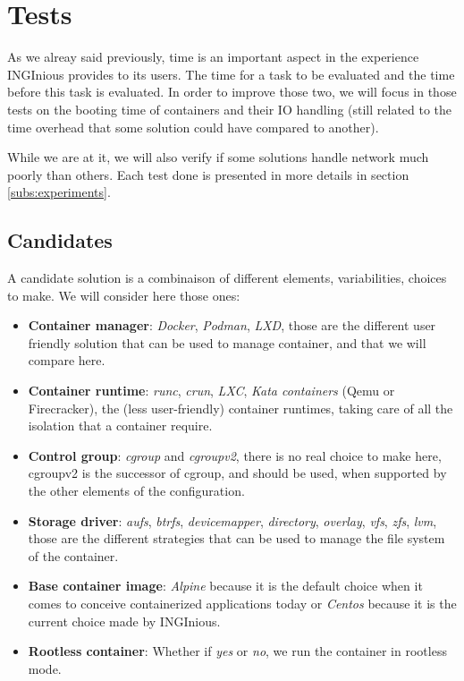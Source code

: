 \section{Tests}
As we alreay said previously, time is an important aspect in the experience INGInious provides to its users.  The time for a task to be evaluated and the time before this task is evaluated.  In order to improve those two, we will focus in those tests on the booting time of containers and their IO handling (still related to the time overhead that some solution could have compared to another).  %

While we are at it, we will also verify if some solutions handle network much poorly than others.  Each test done is presented in more details in section \ref{subs:experiments}.


\subsection{Candidates}\label{subs:candidates}
A candidate solution is a combinaison of different elements, variabilities, choices to make.  We will consider here those ones:
\begin{itemize}
  \renewcommand\labelitemi{--}
  \item \textbf{Container manager}: \textit{Docker}, \textit{Podman}, \textit{LXD}, those are the different user friendly solution that can be used to manage container, and that we will compare here.
  \item \textbf{Container runtime}: \textit{runc}, \textit{crun}, \textit{LXC}, \textit{Kata containers} (Qemu or Firecracker), the (less user-friendly) container runtimes, taking care of all the isolation that a container require.
  \item \textbf{Control group}: \textit{cgroup} and \textit{cgroupv2}, there is no real choice to make here, cgroupv2 is the successor of cgroup, and should be used, when supported by the other elements of the configuration.
  \item \textbf{Storage driver}: \textit{aufs}, \textit{btrfs}, \textit{devicemapper}, \textit{directory}, \textit{overlay}, \textit{vfs}, \textit{zfs}, \textit{lvm}, those are the different strategies that can be used to manage the file system of the container.
  \item \textbf{Base container image}: \textit{Alpine} because it is the default choice when it comes to conceive containerized applications today or \textit{Centos} because it is the current choice made by INGInious.
  \item \textbf{Rootless container}: Whether if \textit{yes} or \textit{no}, we run the container in rootless mode.
\end{itemize}


